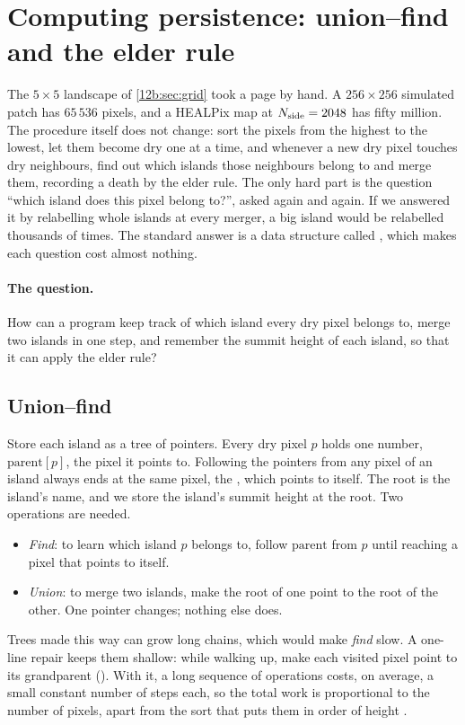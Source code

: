 \section{Computing persistence: union--find and the elder rule}
\label{12b:sec:compute}

The $5\times5$ landscape of \cref{12b:sec:grid} took a page by hand. A $256\times256$ simulated patch has
$65\,536$ pixels, and a HEALPix map at $N_{\rm side}=2048$ has fifty million. The procedure itself does not
change: sort the pixels from the highest to the lowest, let them become dry one at a time, and whenever a new dry
pixel touches dry neighbours, find out which islands those neighbours belong to and merge them, recording a death
by the elder rule. The only hard part is the question ``which island does this pixel belong to?'', asked again
and again. If we answered it by relabelling whole islands at every merger, a big island would be relabelled
thousands of times. The standard answer is a data structure called , which makes each
question cost almost nothing.

\paragraph{The question.} How can a program keep track of which island every dry pixel belongs to, merge two
islands in one step, and remember the summit height of each island, so that it can apply the elder rule?

\subsection{Union--find}
\label{12b:sec:unionfind}

Store each island as a tree of pointers. Every dry pixel $p$ holds one number, $\mathrm{parent}[p]$, the pixel it
points to. Following the pointers from any pixel of an island always ends at the same pixel, the ,
which points to itself. The root is the island's name, and we store the island's summit height at the root.
Two operations are needed.
\begin{itemize}[itemsep=1pt,leftmargin=1.2em]
  \item \emph{Find}: to learn which island $p$ belongs to, follow $\mathrm{parent}$ from $p$ until reaching a
        pixel that points to itself.
  \item \emph{Union}: to merge two islands, make the root of one point to the root of the other. One pointer
        changes; nothing else does.
\end{itemize}
Trees made this way can grow long chains, which would make \emph{find} slow. A one-line repair keeps them
shallow: while walking up, make each visited pixel point to its grandparent (). With it, a
long sequence of operations costs, on average, a small constant number of steps each, so the total work is
proportional to the number of pixels, apart from the sort that puts them in order of height
\cite{Otter2017}.

